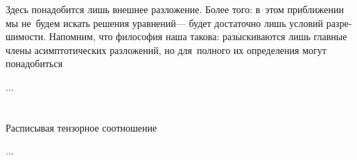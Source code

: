 

\begin{otherlanguage}{russian}

Здесь понадобится лишь внешнее разложение. Более того: в~этом приближении мы не~будем искать решения уравнений\:--- будет достаточно лишь условий разрешимости. Напомним, что философия наша такова: разыскиваются лишь главные члены асимптотических разложений, но для~полного их определения могут понадобиться

...



\end{otherlanguage}

\section{}

\begin{otherlanguage}{russian}

Расписывая тензорное соотношение

...



\end{otherlanguage}






